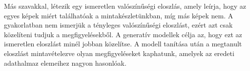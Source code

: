 Más szavakkal, létezik egy ismeretlen valószínűségi eloszlás, amely leírja, hogy az egyes képek miért találhatóak a mintakészletünkban, míg más képek nem. A gyakorlatban nem ismerjük a tényleges valószínűségi eloszlást, ezért azt csak közelíteni tudjuk a megfigyelésekből. A generatív modellek célja az, hogy ezt az ismeretlen eloszlást minél jobban közelítse. A modell tanítása után a  megtanult eloszlást mintavételezve olyan megfigyeléseket kaphatunk, amelyek az eredeti adathalmaz elemeihez nagyon hasonlóak.




